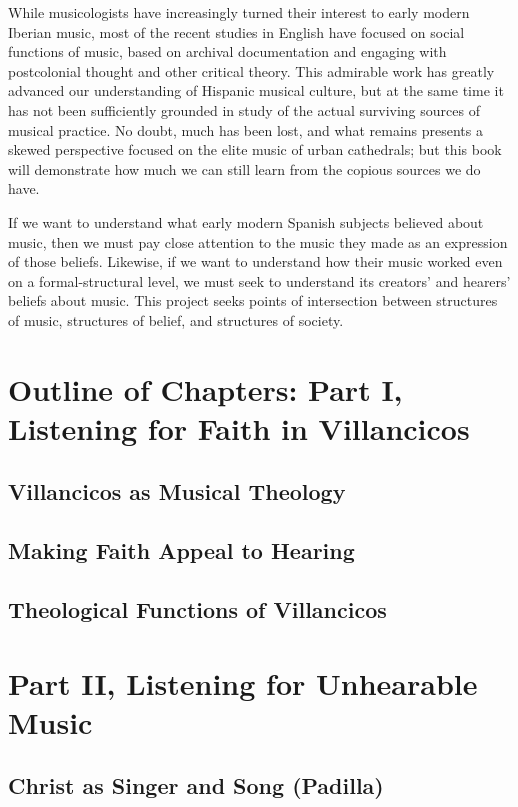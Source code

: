 \documentclass{vcbook-proposal}
\begin{document}
While musicologists have increasingly turned their interest to early modern Iberian music, most of the recent studies in English have focused on social functions of music, based on archival documentation and engaging with postcolonial thought and other critical theory.
This admirable work has greatly advanced our understanding of Hispanic musical culture, but at the same time it has not been sufficiently grounded in study of the actual surviving sources of musical practice.
No doubt, much has been lost, and what remains presents a skewed perspective focused on the elite music of urban cathedrals; but this book will demonstrate how much we can still learn from the copious sources we do have.

If we want to understand what early modern Spanish subjects believed about music, then we must pay close attention to the music they made as an expression of those beliefs.
Likewise, if we want to understand how their music worked even on a formal-structural level, we must seek to understand its creators' and hearers' beliefs about music.
This project seeks points of intersection between structures of music, structures of belief, and structures of society.


\section{Outline of Chapters: Part I, Listening for Faith in Villancicos}

\subsection{Villancicos as Musical Theology}

\subsection{Making Faith Appeal to Hearing}

\subsection{Theological Functions of Villancicos}


\section{Part II, Listening for Unhearable Music}

\subsection{Christ as Singer and Song (Padilla)}
\end{document}
